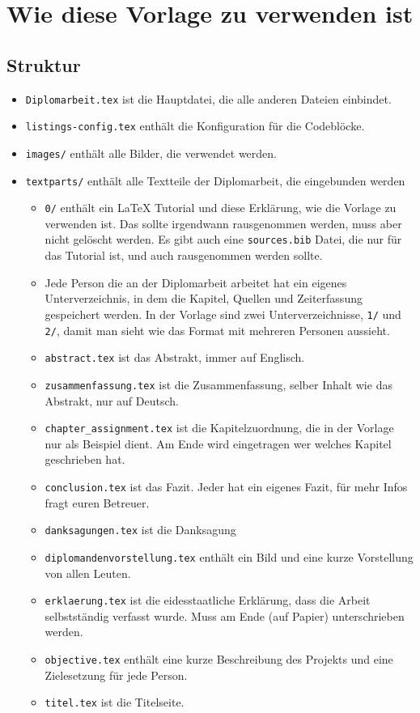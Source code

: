 \chapter{Wie diese Vorlage zu verwenden ist}

\section{Struktur}

\begin{itemize}
    \item \texttt{Diplomarbeit.tex} ist die Hauptdatei, die alle anderen Dateien einbindet.
    \item \texttt{listings-config.tex} enthält die Konfiguration für die Codeblöcke.
    \item \texttt{images/} enthält alle Bilder, die verwendet werden.
    \item \texttt{textparts/} enthält alle Textteile der Diplomarbeit, die eingebunden werden
    \begin{itemize}
        \item \texttt{0/} enthält ein \LaTeX{} Tutorial und diese Erklärung, wie die Vorlage zu verwenden ist. Das sollte irgendwann rausgenommen werden, muss aber nicht gelöscht werden. Es gibt auch eine \texttt{sources.bib} Datei, die nur für das Tutorial ist, und auch rausgenommen werden sollte.
        \item Jede Person die an der Diplomarbeit arbeitet hat ein eigenes Unterverzeichnis, in dem die Kapitel, Quellen und Zeiterfassung gespeichert werden. In der Vorlage sind zwei Unterverzeichnisse, \texttt{1/} und \texttt{2/}, damit man sieht wie das Format mit mehreren Personen aussieht.
        \item \texttt{abstract.tex} ist das Abstrakt, immer auf Englisch.
        \item \texttt{zusammenfassung.tex} ist die Zusammenfassung, selber Inhalt wie das Abstrakt, nur auf Deutsch.
        \item \texttt{chapter\_assignment.tex} ist die Kapitelzuordnung, die in der Vorlage nur als Beispiel dient. Am Ende wird eingetragen wer welches Kapitel geschrieben hat.
        \item \texttt{conclusion.tex} ist das Fazit. Jeder hat ein eigenes Fazit, für mehr Infos fragt euren Betreuer.
        \item \texttt{danksagungen.tex} ist die Danksagung
        \item \texttt{diplomandenvorstellung.tex} enthält ein Bild und eine kurze Vorstellung von allen Leuten.
        \item \texttt{erklaerung.tex} ist die eidesstaatliche Erklärung, dass die Arbeit selbstständig verfasst wurde. Muss am Ende (auf Papier) unterschrieben werden.
        \item \texttt{objective.tex} enthält eine kurze Beschreibung des Projekts und eine Zielesetzung für jede Person.
        \item \texttt{titel.tex} ist die Titelseite.
    \end{itemize}
\end{itemize}

